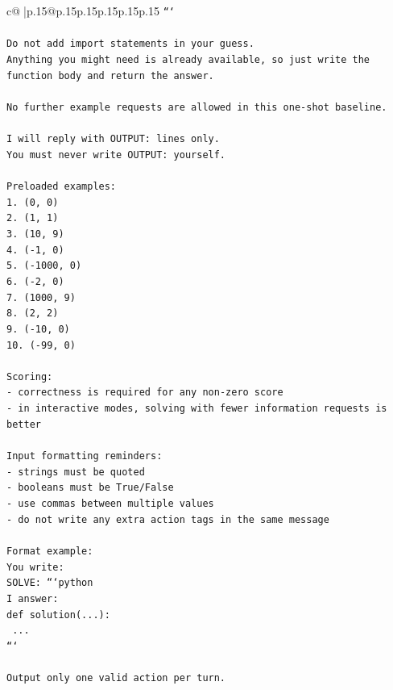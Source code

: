 \documentclass{article}
\begin{document}
{\begin{supertabular}{c@{$\;$}|p{.15\linewidth}@{}p{.15\linewidth}p{.15\linewidth}p{.15\linewidth}p{.15\linewidth}p{.15\linewidth}}
{{{\texttt{```} \\
\\ 
\texttt{Do not add import statements in your guess.} \\
\texttt{Anything you might need is already available, so just write the function body and return the answer.} \\
\\ 
\texttt{No further example requests are allowed in this one{-}shot baseline.} \\
\\ 
\texttt{I will reply with OUTPUT: lines only.} \\
\texttt{You must never write OUTPUT: yourself.} \\
\\ 
\texttt{Preloaded examples:} \\
\texttt{1. (0, 0)} \\
\texttt{2. (1, 1)} \\
\texttt{3. (10, 9)} \\
\texttt{4. ({-}1, 0)} \\
\texttt{5. ({-}1000, 0)} \\
\texttt{6. ({-}2, 0)} \\
\texttt{7. (1000, 9)} \\
\texttt{8. (2, 2)} \\
\texttt{9. ({-}10, 0)} \\
\texttt{10. ({-}99, 0)} \\
\\ 
\texttt{Scoring:} \\
\texttt{{-} correctness is required for any non{-}zero score} \\
\texttt{{-} in interactive modes, solving with fewer information requests is better} \\
\\ 
\texttt{Input formatting reminders:} \\
\texttt{{-} strings must be quoted} \\
\texttt{{-} booleans must be True/False} \\
\texttt{{-} use commas between multiple values} \\
\texttt{{-} do not write any extra action tags in the same message} \\
\\ 
\texttt{Format example:} \\
\texttt{You write:} \\
\texttt{SOLVE: ```python} \\
\texttt{I answer:} \\
\texttt{def solution(...):} \\
\texttt{    ...} \\
\texttt{```} \\
\\ 
\texttt{Output only one valid action per turn.} \\
            }
        }
    }
     \\ \\


\end{supertabular}}
\end{document}
